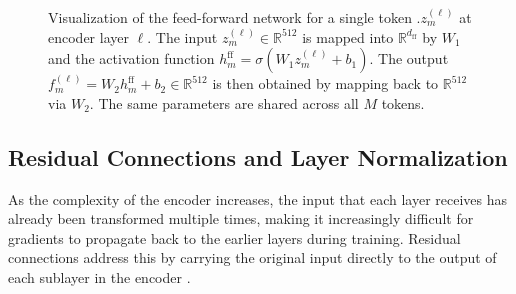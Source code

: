 \begin{figure}[h]
    \caption{Visualization of the feed-forward network for a single token $.z^{(\ell)}_m$ at encoder layer $\ell$. The input $z^{(\ell)}_m \in \mathbb{R}^{512}$ is mapped into $\mathbb{R}^{d_{\mathrm{ff}}}$ by $W_1$ and the activation function $h_m^{\mathrm{ff}} = \sigma(W_1 z^{(\ell)}_m + b_1)$. The output $f^{(\ell)}_m = W_2 h_m^{\mathrm{ff}} + b_2 \in \mathbb{R}^{512}$ is then obtained by mapping back to $\mathbb{R}^{512}$ via $W_2$. The same parameters are shared across all $M$ tokens.}
    \label{fig:ffn}
\end{figure}

\subsection{Residual Connections and Layer Normalization}
\label{sec:residual}
As the complexity of the encoder increases, the input that each layer receives has already been transformed multiple times, making it increasingly difficult for gradients to propagate back to the earlier layers during training. Residual connections address this by carrying the original input directly to the output of each sublayer in the encoder \citep{ResNet}.


